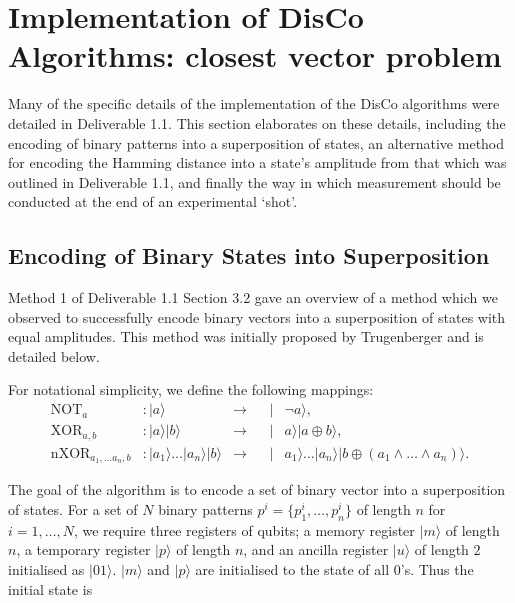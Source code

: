 \section{Implementation of DisCo Algorithms: closest vector problem}
\label{sec:implementation_of_closest_Vector_algorithms}
Many of the specific details of the implementation of the DisCo algorithms were detailed in Deliverable 1.1. This section elaborates on these details, including the encoding of binary patterns into a superposition of states, an alternative method for encoding the Hamming distance into a state's amplitude from that which was outlined in Deliverable 1.1, and finally the way in which measurement should be conducted at the end of an experimental `shot'.

\subsection{Encoding of Binary States into Superposition}
\label{sec:encoding_binary_states_superposition}
Method 1 of Deliverable 1.1 Section 3.2 gave an overview of a method which we observed to successfully encode binary vectors into a superposition of states with equal amplitudes. This method was initially proposed by Trugenberger \cite{Trugenberger_2001} and is detailed below.

For notational simplicity, we define the following mappings:
\begin{align}
    \textrm{NOT}_{a} &: \vert a \rangle & \rightarrow & & \vert& \lnot a \rangle, \\  
    \textrm{XOR}_{a,b} &: \vert a \rangle \vert b \rangle & \rightarrow & & \vert& a \rangle \vert a \oplus b \rangle, \\  
    \textrm{nXOR}_{a_{1},\dots a_{n} ,b} &: \vert a_1 \rangle \dots\vert a_{n} \rangle \vert b \rangle &\rightarrow & & \vert& a_1 \rangle \dots \vert a_{n} \rangle \vert b \oplus (a_{1} \wedge \dots \wedge a_{n}) \rangle  .
\end{align}

The goal of the algorithm is to encode a set of binary vector into a superposition of states. For a set of $N$ binary patterns $p^i = \{p_1^i, \dots, p_n^i \} $ of length $n$ for $i=1,\dots,N$, we require three registers of qubits; a memory register $\vert m \rangle$ of length $n$, a temporary register $\vert p \rangle$ of length $n$, and an ancilla register $\vert u \rangle$ of length $2$ initialised as $\vert 01 \rangle$. $\vert m \rangle$ and $\vert p \rangle$ are initialised to the state of all $0$'s. Thus the initial state is


